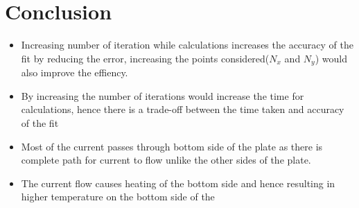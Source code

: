 \documentclass[11pt, a4paper]{article}
\begin{document}
    \section{Conclusion}
    \begin{itemize}
    \item
    Increasing number of iteration while calculations increases the accuracy of the fit by reducing the error, increasing the points considered(\(N_x\) and \(N_y\)) would also improve the effiency.
    
    \item
    By increasing the number of iterations would increase the time for calculations, hence there is a trade-off between the time taken and accuracy of the fit
    
    \item
    Most of the current passes through bottom side of the plate as there is complete path for current to flow unlike the other sides of the plate.
    \item
    The current flow causes heating of the bottom side and hence resulting in higher temperature on the bottom side of the 
    
    \end{itemize}    
\end{document}
